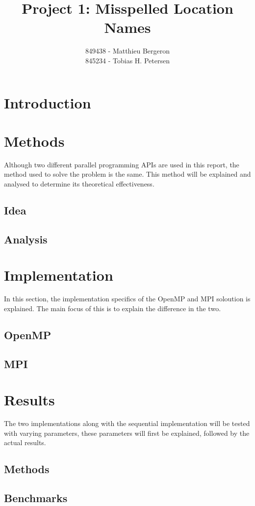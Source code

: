 \documentclass[11pt]{article}
\title{Project 1: Misspelled Location Names}
\author
{849438 - Matthieu Bergeron\\845234 - Tobias H. Petersen}
\begin{document}
\maketitle
\section{Introduction}

\section{Methods}
Although two different parallel programming APIs are used in this report, the method used to solve the problem is the same. This method will be explained and analysed to determine its theoretical effectiveness.
\subsection{Idea}

\subsection{Analysis}

\section{Implementation}
In this section, the implementation specifics of the OpenMP and MPI soloution is explained. The main focus of this is to explain the difference in the two.
\subsection{OpenMP}

\subsection{MPI}

\section{Results}
The two implementations along with the sequential implementation will be tested with varying parameters, these parameters will first be explained, followed by the actual results.
\subsection{Methods}

\subsection{Benchmarks}

\end{document}
